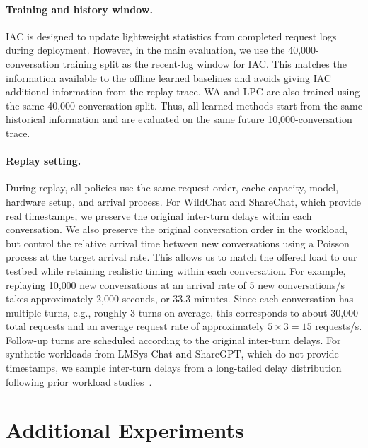 \documentclass{article}
\begin{document}
\paragraph{Training and history window.}
IAC is designed to update lightweight statistics from completed request logs during deployment. However, in the main evaluation, we use the 40{,}000-conversation training split as the recent-log window for IAC. This matches the information available to the offline learned baselines and avoids giving IAC additional information from the replay trace. WA and LPC are also trained using the same 40{,}000-conversation split. Thus, all learned methods start from the same historical information and are evaluated on the same future 10{,}000-conversation trace.

\paragraph{Replay setting.}
During replay, all policies use the same request order, cache capacity, model, hardware setup, and arrival process. For WildChat and ShareChat, which provide real timestamps, we preserve the original inter-turn delays within each conversation. We also preserve the original conversation order in the workload, but control the relative arrival time between new conversations using a Poisson process at the target arrival rate. This allows us to match the offered load to our testbed while retaining realistic timing within each conversation. For example, replaying 10{,}000 new conversations at an arrival rate of 5 new conversations/s takes approximately 2{,}000 seconds, or 33.3 minutes. Since each conversation has multiple turns, e.g., roughly 3 turns on average, this corresponds to about 30{,}000 total requests and an average request rate of approximately \(5 \times 3 = 15\) requests/s. Follow-up turns are scheduled according to the original inter-turn delays. For synthetic workloads from LMSys-Chat and ShareGPT, which do not provide timestamps, we sample inter-turn delays from a long-tailed delay distribution following prior workload studies~\cite{servegen,wang2025kvcache}.








\section{Additional Experiments}
\end{document}
